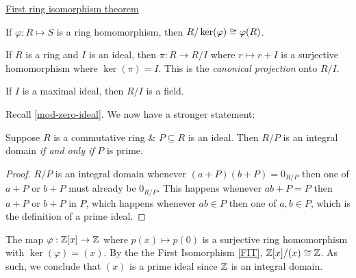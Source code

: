 \documentclass[12pt]{article}
\begin{document}
\begin{theorem}\label{FIT}
    \underline{First ring isomorphism theorem}

    If  $\varphi: R\mapsto S$ is a ring homomorphism, then $R/\ker(\varphi)\cong \varphi (R)$.
\end{theorem}

\eg If $R$ is a ring and $I$ is an ideal, then $\pi : R\rightarrow R/I$ where $r\mapsto r+I$ is a surjective homomorphism where $\ker(\pi)=I$. This is the \textit{canonical projection} onto $R/I$.

\begin{corollary}
    If $I$ is a maximal ideal, then $R/I$ is a field.
\end{corollary}

Recall \cref{mod-zero-ideal}. We now have a stronger statement:

\begin{proposition}
    Suppose $R$ is a commutative ring \& $P\subseteq R$ is an ideal. Then $R/P$ is an integral domain \textit{if and only if }$P$ is prime.
\end{proposition}
\begin{proof}
    $R/P$ is an integral domain \ifnif whenever $(a+P)(b+P)=0_{R/P}$ then one of $a+P$ or $b+P$ must already be $0_{R/P}$. This happens \ifnif whenever $ab+P=P$ then $a+P$ or $b+P$ in $P$, which happens \ifnif whenever $ab\in P$ then one of $a,b\in P$, which is the definition of a prime ideal.
\end{proof}

\eg The map $\varphi: \mathbb{Z}[x]\to \mathbb{Z}$ where $p(x)\mapsto p(0)$ is a surjective ring homomorphism with $\ker(\varphi)=(x)$. By the the First Isomorphism \cref{FIT}, $\mathbb{Z}[x]/(x)\cong \mathbb{Z}$.  As such, we conclude that $(x)$ is a prime ideal since $\mathbb{Z}$ is an integral domain.
\end{document}
